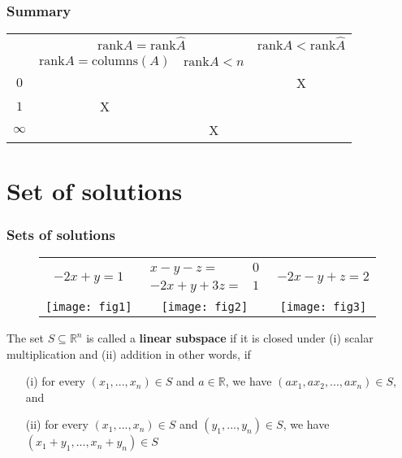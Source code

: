 \documentclass[compress]{beamer}
\newcommand{\rank}{\mathrm{rank}}
\begin{document}
\begin{frame}
  \frametitle{Summary}
  \begin{centering}
  \begin{tabular}{c|c|c|c} 
    & \multicolumn{2}{c}{$\rank A = \rank \hat{A}$} &  
    $\rank A < \rank \hat{A} $ \\ 
    & $\rank A = \mathrm{columns}(A)$ & 
    $\rank A < n$ & \\ \hline
    $0$ &  &  & X \\
    $1$ & X & & \\
    $\infty$ & & X & \\ \hline
  \end{tabular}
  \end{centering}
\end{frame}

\section{Set of solutions}

\begin{frame}
  \frametitle{Sets of solutions}
\begin{figure}\label{fig:solnSets}
  \begin{tabular}{ccc}
    $-2x + y = 1$
    &
    $\begin{array}{cc} 
      x - y - z = & 0 \\
      -2x + y + 3z = & 1 
    \end{array}$    
    & 
    $
    -2x - y +  z =  2
    $
    \\
    \texttt{[image: fig1]} & 
    \texttt{[image: fig2]} & 
    \texttt{[image: fig3]} 
  \end{tabular}
\end{figure}
\end{frame}

\begin{frame}
  \begin{definition}
    The set $S \subseteq \mathbb{R}^n$ is called a \textbf{linear
      subspace} if it is closed under (i) scalar multiplication and (ii)
    addition in other words, if 
    \begin{itemize}
    \item[(i)] for every $(x_1, ..., x_n)\in S$ and $a \in \mathbb{R}$,
      we have $(a x_1, a x_2, ..., a x_n) \in S$, and
    \item[(ii)] for every $(x_1, ..., x_n)\in S$ and $(y_1, ..., y_n)\in
      S$, we have
      $(x_1 + y_1, ..., x_n + y_n)  \in S$
    \end{itemize}
  \end{definition}
\end{frame}
\end{document}
